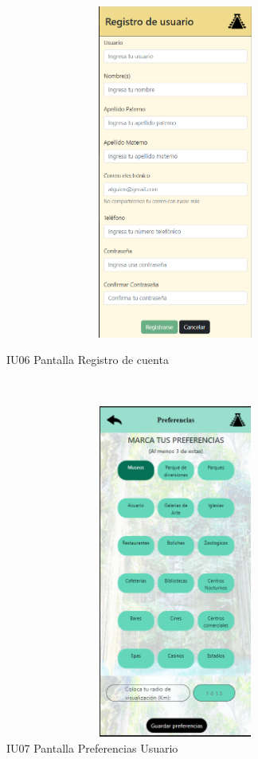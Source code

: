 \begin{figure}[htb]
        \begin{minipage}{1\textwidth}
        \centering
        \includegraphics[width=17cm, height=11cm]{front/PANTALLAS FUNCIONALES 3 DICIEMBRE/IU06_Pantalla Registro de cuenta.png}
        \caption{IU06 Pantalla Registro de cuenta}
    \end{minipage}%
    \\
        \begin{minipage}{1\textwidth}
        \centering
        \includegraphics[width=17cm, height=11cm]{front/PANTALLAS FUNCIONALES 3 DICIEMBRE/IU07_Pantalla Preferencias Usuario.png}
        \caption{IU07 Pantalla Preferencias Usuario}
    \end{minipage}%
\end{figure}

